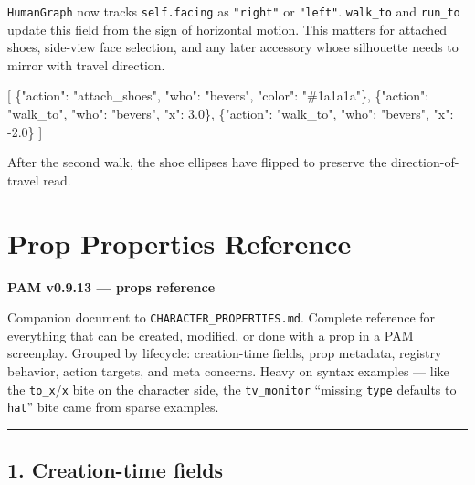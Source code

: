 \documentclass[
  11pt,
]{book}
\newenvironment{Shaded}{}{}
\newcommand{\DataTypeTok}[1]{\textcolor[rgb]{0.56,0.13,0.00}{#1}}
\newcommand{\FloatTok}[1]{\textcolor[rgb]{0.25,0.63,0.44}{#1}}
\newcommand{\FunctionTok}[1]{\textcolor[rgb]{0.02,0.16,0.49}{#1}}
\newcommand{\OtherTok}[1]{\textcolor[rgb]{0.00,0.44,0.13}{#1}}
\newcommand{\StringTok}[1]{\textcolor[rgb]{0.25,0.44,0.63}{#1}}
\begin{document}
\texttt{HumanGraph} now tracks \texttt{self.facing} as \texttt{"right"}
or \texttt{"left"}. \texttt{walk\_to} and \texttt{run\_to} update this
field from the sign of horizontal motion. This matters for attached
shoes, side-view face selection, and any later accessory whose
silhouette needs to mirror with travel direction.

\begin{Shaded}
\begin{Highlighting}[]
\OtherTok{[}
  \FunctionTok{\{}\DataTypeTok{"action"}\FunctionTok{:} \StringTok{"attach\_shoes"}\FunctionTok{,} \DataTypeTok{"who"}\FunctionTok{:} \StringTok{"bevers"}\FunctionTok{,} \DataTypeTok{"color"}\FunctionTok{:} \StringTok{"\#1a1a1a"}\FunctionTok{\}}\OtherTok{,}
  \FunctionTok{\{}\DataTypeTok{"action"}\FunctionTok{:} \StringTok{"walk\_to"}\FunctionTok{,} \DataTypeTok{"who"}\FunctionTok{:} \StringTok{"bevers"}\FunctionTok{,} \DataTypeTok{"x"}\FunctionTok{:} \FloatTok{3.0}\FunctionTok{\}}\OtherTok{,}
  \FunctionTok{\{}\DataTypeTok{"action"}\FunctionTok{:} \StringTok{"walk\_to"}\FunctionTok{,} \DataTypeTok{"who"}\FunctionTok{:} \StringTok{"bevers"}\FunctionTok{,} \DataTypeTok{"x"}\FunctionTok{:} \FloatTok{{-}2.0}\FunctionTok{\}}
\OtherTok{]}
\end{Highlighting}
\end{Shaded}

After the second walk, the shoe ellipses have flipped to preserve the
direction-of-travel read.


\chapter{Prop Properties Reference}\label{prop-properties-reference}

\textbf{PAM v0.9.13 --- props reference}

Companion document to \texttt{CHARACTER\_PROPERTIES.md}. Complete
reference for everything that can be created, modified, or done with a
prop in a PAM screenplay. Grouped by lifecycle: creation-time fields,
prop metadata, registry behavior, action targets, and meta concerns.
Heavy on syntax examples --- like the \texttt{to\_x}/\texttt{x} bite on
the character side, the \texttt{tv\_monitor} ``missing \texttt{type}
defaults to \texttt{hat}'' bite came from sparse examples.

\begin{center}\rule{0.5\linewidth}{0.5pt}\end{center}

\section{1. Creation-time fields}\label{creation-time-fields}
\end{document}

